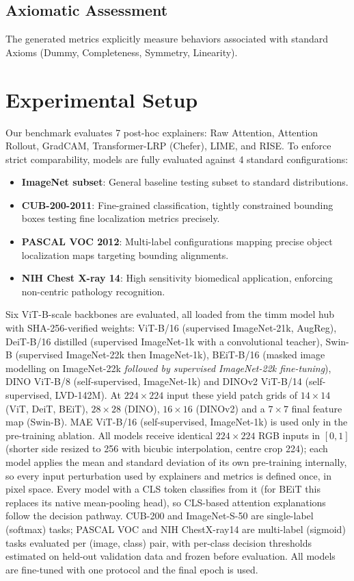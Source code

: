 \documentclass[10pt,journal,compsoc]{IEEEtran}
\begin{document}
\subsection{Axiomatic Assessment}
The generated metrics explicitly measure behaviors associated with standard Axioms (Dummy, Completeness, Symmetry, Linearity). 

\section{Experimental Setup}
\label{sec:experimental_setup}
Our benchmark evaluates 7 post-hoc explainers: Raw Attention, Attention Rollout, GradCAM, Transformer-LRP (Chefer), LIME, and RISE. To enforce strict comparability, models are fully evaluated against 4 standard configurations:
\begin{itemize}
    \item \textbf{ImageNet subset}: General baseline testing subset to standard distributions.
    \item \textbf{CUB-200-2011}: Fine-grained classification, tightly constrained bounding boxes testing fine localization metrics precisely.
    \item \textbf{PASCAL VOC 2012}: Multi-label configurations mapping precise object localization maps targeting bounding alignments.
    \item \textbf{NIH Chest X-ray 14}: High sensitivity biomedical application, enforcing non-centric pathology recognition.
\end{itemize}
Six ViT-B-scale backbones are evaluated, all loaded from the timm model hub with SHA-256-verified weights: ViT-B/16 (supervised ImageNet-21k, AugReg), DeiT-B/16 distilled (supervised ImageNet-1k with a convolutional teacher), Swin-B (supervised ImageNet-22k then ImageNet-1k), BEiT-B/16 (masked image modelling on ImageNet-22k \emph{followed by supervised ImageNet-22k fine-tuning}), DINO ViT-B/8 (self-supervised, ImageNet-1k) and DINOv2 ViT-B/14 (self-supervised, LVD-142M). At $224\times224$ input these yield patch grids of $14\times14$ (ViT, DeiT, BEiT), $28\times28$ (DINO), $16\times16$ (DINOv2) and a $7\times7$ final feature map (Swin-B). MAE ViT-B/16 (self-supervised, ImageNet-1k) is used only in the pre-training ablation. All models receive identical $224\times224$ RGB inputs in $[0,1]$ (shorter side resized to 256 with bicubic interpolation, centre crop 224); each model applies the mean and standard deviation of its own pre-training internally, so every input perturbation used by explainers and metrics is defined once, in pixel space. Every model with a CLS token classifies from it (for BEiT this replaces its native mean-pooling head), so CLS-based attention explanations follow the decision pathway. CUB-200 and ImageNet-S-50 are single-label (softmax) tasks; PASCAL VOC and NIH ChestX-ray14 are multi-label (sigmoid) tasks evaluated per (image, class) pair, with per-class decision thresholds estimated on held-out validation data and frozen before evaluation. All models are fine-tuned with one protocol and the final epoch is used. 
\end{document}
